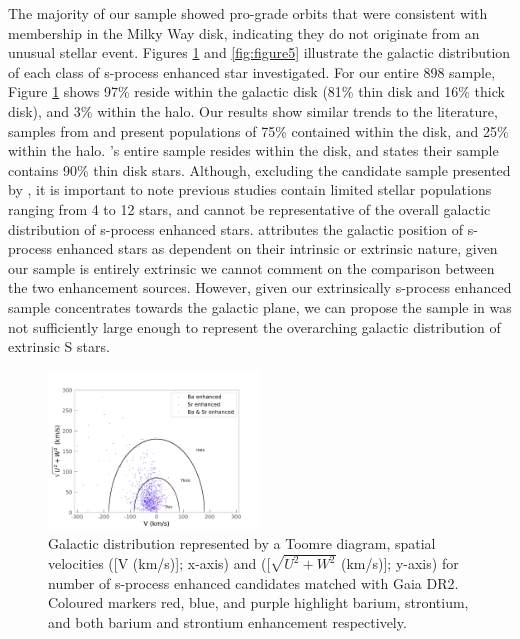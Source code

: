 \documentclass[a4paper,fleqn,usenatbib]{mnras}
\begin{document}
The majority of our sample showed pro-grade orbits that were consistent with membership in the Milky Way disk, indicating they do not originate from an unusual stellar event. Figures \ref{fig:figure4} and \ref{fig:figure5} illustrate the galactic distribution of each class of s-process enhanced star investigated. For our entire 898 sample, Figure \ref{fig:figure4} shows 97\% reside within the galactic disk (81\% thin disk and 16\% thick disk), and 3\% within the halo. Our results show similar trends to the literature, samples from \cite{gomez1997} and \cite{mennessier1997} present populations of 75\% contained within the disk, and 25\% within the halo. \cite{pereira2011}’s entire sample resides within the disk, and \cite{decastro2016} states their sample contains 90\% thin disk stars. Although, excluding the candidate sample presented by \cite{decastro2016}, it is important to note previous studies contain limited stellar populations ranging from 4 to 12 stars, and cannot be representative of the overall galactic distribution of s-process enhanced stars. \cite{jorissen1993} attributes the galactic position of s-process enhanced stars as dependent on their intrinsic or extrinsic nature, given our sample is entirely extrinsic we cannot comment on the comparison between the two enhancement sources. However, given our extrinsically s-process enhanced sample concentrates towards the galactic plane, we can propose the sample in \cite{jorissen1993} was not sufficiently large enough to represent the overarching galactic distribution of extrinsic S stars.

\begin{figure}
	\includegraphics[width=0.5\textwidth]{toomre.pdf}
	\caption{Galactic distribution represented by a Toomre diagram, spatial velocities ([V (km/s)]; x-axis) and ([$\sqrt{U^2+W^2}$ (km/s)]; y-axis) for number of s-process enhanced candidates matched with Gaia DR2. Coloured markers red, blue, and purple highlight barium, strontium, and both barium and strontium enhancement respectively.}
	\label{fig:figure4}
\end{figure}
\end{document}
